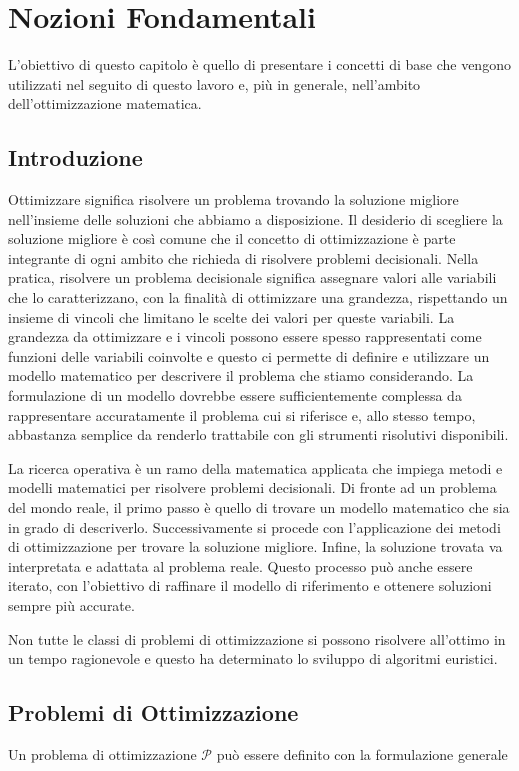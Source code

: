 \chapter{Nozioni Fondamentali}
L'obiettivo di questo capitolo è quello di presentare i concetti di base
che vengono utilizzati nel seguito di questo lavoro e, più in generale,
nell'ambito dell'ottimizzazione matematica.

\section{Introduzione}
Ottimizzare significa risolvere un problema trovando la soluzione migliore
nell'insieme delle soluzioni che abbiamo a disposizione. Il desiderio di
scegliere la soluzione migliore è così comune che il concetto di
ottimizzazione è parte integrante di ogni ambito che richieda di risolvere
problemi decisionali. Nella pratica, risolvere un problema decisionale
significa assegnare valori alle variabili che lo caratterizzano, con
la finalità di ottimizzare una grandezza, rispettando un insieme di
vincoli che limitano le scelte dei valori per queste variabili. La
grandezza da ottimizzare e i vincoli possono essere spesso
rappresentati come funzioni delle variabili coinvolte e questo ci permette
di definire e utilizzare un modello matematico per descrivere il problema che stiamo
considerando. La formulazione di un modello dovrebbe essere
sufficientemente complessa da rappresentare accuratamente il problema cui
si riferisce e, allo stesso tempo, abbastanza semplice da renderlo
trattabile con gli strumenti risolutivi disponibili.

La ricerca operativa è un ramo della matematica applicata che impiega
metodi e modelli matematici per risolvere problemi decisionali. Di fronte
ad un problema del mondo reale, il primo passo è quello di trovare un modello
matematico che sia in grado di descriverlo. Successivamente si procede con
l'applicazione dei metodi di ottimizzazione per trovare la soluzione
migliore. Infine, la soluzione trovata va interpretata e adattata al
problema reale. Questo processo può anche essere iterato, con l'obiettivo di
raffinare il modello di riferimento e ottenere
soluzioni sempre più accurate.

Non tutte le classi di problemi di ottimizzazione si possono risolvere
all'ottimo in un tempo ragionevole e questo ha determinato lo sviluppo di
algoritmi euristici.

\section{Problemi di Ottimizzazione}\label{sec:opt_probs}
Un problema di ottimizzazione $\mathcal{P}$ può essere definito con la
formulazione generale


